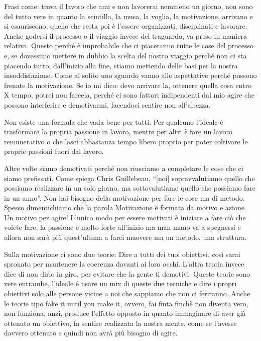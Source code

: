 \documentclass[12pt]{book} %
\begin{document}
\begin{mdframed}[linewidth=1pt]
Frasi come: trova il lavoro che ami e non lavorerai nemmeno un giorno, non sono del tutto vere in quanto la scintilla,
la musa, la voglia, la motivazione, arrivano e si esauriscono, quello che resta poi è l'essere organizzati,
disciplinati e lavorare. Anche godersi il processo o il viaggio invece del traguardo, va preso in maniera relativa.
Questo perché è improbabile che ci piaceranno tutte le cose del processo e, se dovessimo mettere in dubbio la scelta
del nostro viaggio perché non ci sta piacendo tutto, dall'inizio alla fine, stiamo mettendo delle
basi per la nostra insoddisfazione. Come al solito uno sguardo vanno alle aspettative perché possono frenate la
motivazione. Se io mi dico: devo arrivare la, ottenere quella cosa entro X tempo, potrei non farcela, perché ci sono
fattori indipendenti dal mio agire che possono interferire e demotivarmi, facendoci sentire non all'altezza.

Non esiste una formula che vada bene per tutti. Per qualcuno l'ideale è trasformare la propria
passione in lavoro, mentre per altri è fare un lavoro remunerativo o che lasci abbastanza tempo libero proprio per
poter coltivare le proprie passioni fuori dal lavoro.

Altre volte siamo demotivati perché non riusciamo a completare le cose che ci siamo prefissati. Come spiega Chris
Guillebeau, “[noi] sopravvalutiamo quello che possiamo realizzare in un solo giorno, ma sottovalutiamo quello che
possiamo fare in un anno”. Non hai bisogno della motivazione per fare le cose ma di metodo. Spesso dimentichiamo che la
parola Motivazione è formata da motivo e azione. Un motivo per agire! L'unico modo per essere motivati è iniziare a
fare ciò che volete fare, la passione è molto forte all'inizio ma man mano va a spegnersi e allora
non sarà più quest'ultima a farci muovere ma un metodo, una struttura.

Sulla motivazione ci sono due teorie: 
Dire a tutti dei tuoi obiettivi, così sarai spronato per mantenere la coerenza davanti ai loro occhi.
L'altra teoria invece dice di non dirlo in giro, per evitare che la gente ti demotivi. Queste teorie sono vere entrambe, l'ideale é usare un mix di queste due tecniche e dire i propri obiettivi solo alle persone vicine a noi che sappiamo che non ci feriranno.
Anche le teorie tipo fake it until you make it, ovvero, fai finta finchè non diventa vero, non funziona, anzi, produce l'effetto opposto in quanto immaginare di aver già ottenuto un obiettivo, fa sentire realizzata la nostra mente, come se l'avesse davvero ottenuto e quindi non avrà più bisogno di agire.


\end{mdframed}
\end{document}

